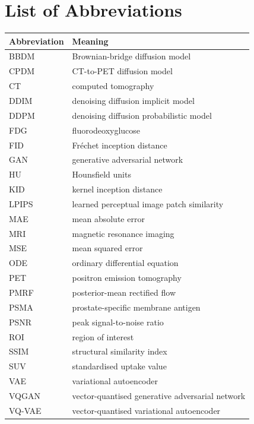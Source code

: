 \documentclass[11pt,a4paper]{article}
\begin{document}
\tableofcontents
\clearpage

\listoftables
{}
\listoffigures
\clearpage

\section*{List of Abbreviations}
\begin{center}
\begin{tabular}{@{}ll@{}}
\toprule
Abbreviation & Meaning \\
\midrule
BBDM   & Brownian-bridge diffusion model \\
CPDM   & CT-to-PET diffusion model \\
CT     & computed tomography \\
DDIM   & denoising diffusion implicit model \\
DDPM   & denoising diffusion probabilistic model \\
FDG    & fluorodeoxyglucose \\
FID    & Fr\'echet inception distance \\
GAN    & generative adversarial network \\
HU     & Hounsfield units \\
KID    & kernel inception distance \\
LPIPS  & learned perceptual image patch similarity \\
MAE    & mean absolute error \\
MRI    & magnetic resonance imaging \\
MSE    & mean squared error \\
ODE    & ordinary differential equation \\
PET    & positron emission tomography \\
PMRF   & posterior-mean rectified flow \\
PSMA   & prostate-specific membrane antigen \\
PSNR   & peak signal-to-noise ratio \\
ROI    & region of interest \\
SSIM   & structural similarity index \\
SUV    & standardised uptake value \\
VAE    & variational autoencoder \\
VQGAN  & vector-quantised generative adversarial network \\
VQ-VAE & vector-quantised variational autoencoder \\
\bottomrule
\end{tabular}
\end{center}
\clearpage
\end{document}

